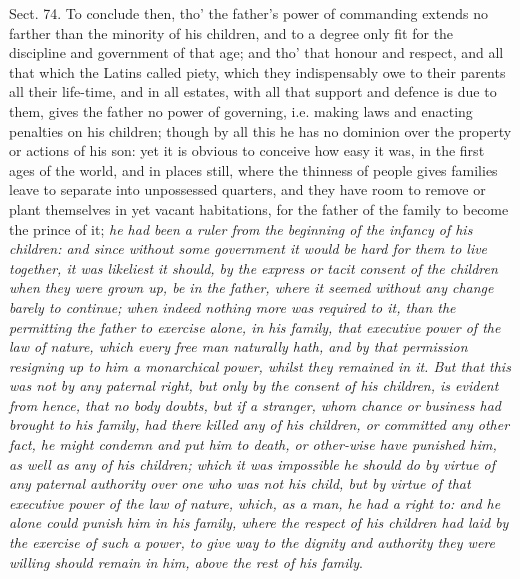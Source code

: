 \documentclass[11pt,openany]{book}
\begin{document}
Sect. 74. To conclude then, tho' the father's power of commanding extends no farther than the minority of his children, and to a degree only fit for the discipline and government of that age; and tho' that honour and respect, and all that which the Latins called piety, which they indispensably owe to their parents all their life-time, and in all estates, with all that support and defence is due to them, gives the father no power of governing, i.e. making laws and enacting penalties on his children; though by all this he has no dominion over the property or actions of his son: yet it is obvious to conceive how easy it was, in the first ages of the world, and in places still, where the thinness of people gives families leave to separate into unpossessed quarters, and they have room to remove or plant themselves in yet vacant habitations, for the father of the family to become the prince of it; \emph{he had been a ruler from the beginning of the infancy of his children: and since without some government it would be hard for them to live together, it was likeliest it should, by the express or tacit consent of the children when they were grown up, be in the father, where it seemed without any change barely to continue; when indeed nothing more was required to it, than the permitting the father to exercise alone, in his family, that executive power of the law of nature, which every free man naturally hath, and by that permission resigning up to him a monarchical power, whilst they remained in it. But that this was not by any paternal right, but only by the consent of his children, is evident from hence, that no body doubts, but if a stranger, whom chance or business had brought to his family, had there killed any of his children, or committed any other fact, he might condemn and put him to death, or other-wise have punished him, as well as any of his children; which it was impossible he should do by virtue of any paternal authority over one who was not his child, but by virtue of that executive power of the law of nature, which, as a man, he had a right to: and he alone could punish him in his family, where the respect of his children had laid by the exercise of such a power, to give way to the dignity and authority they were willing should remain in him, above the rest of his family}.
\end{document}
